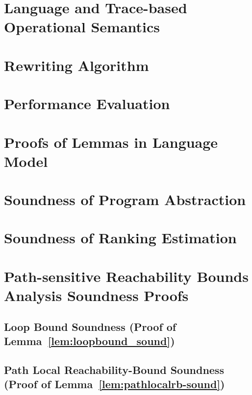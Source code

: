 \section{Language and Trace-based Operational Semantics}
\label{apdx:language}

\clearpage

\section{Rewriting Algorithm}
\label{apdx:alg-rewrite}

\clearpage

\section{Performance Evaluation}
\label{apdx:eval-performance}

\clearpage
\section{Proofs of Lemmas in Language Model}
\label{apdx:lem_language}

\clearpage
\section{Soundness of Program Abstraction}
\label{apdx:abs_sound}

\clearpage
\section{Soundness of Ranking Estimation}
\label{apdx:pathinsensitive_rb_soundness}

\clearpage

\section{Path-sensitive Reachability Bounds Analysis Soundness Proofs}
\label{apdx:pathsensitive_rb_soundness}

\subsection{Loop Bound Soundness (Proof of Lemma~\ref{lem:loopbound_sound})}
\label{apdx:loopbound-sound}

\clearpage

\subsection{Path Local Reachability-Bound Soundness (Proof of Lemma~\ref{lem:pathlocalrb-sound})}
\label{apdx:pathlocalrb-sound}

\clearpage

